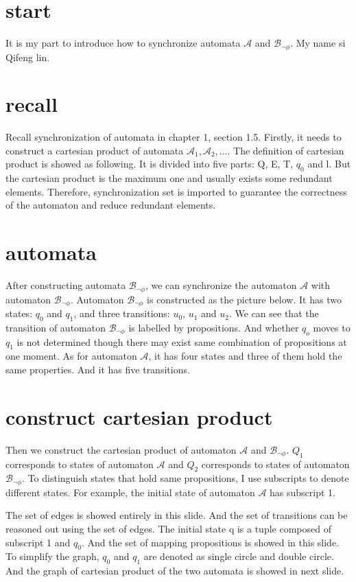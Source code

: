 \documentclass{article}
\begin{document}
    \section{start}
        It is my part to introduce how to synchronize automata $\mathcal{A}$ and $\mathcal{B}_{\neg\phi}$. My name si Qifeng lin.
        
    \section{recall}
        Recall synchronization of automata in chapter 1, section 1.5. Firstly, it needs to construct a cartesian product of automata $\mathcal{A}_1,\mathcal{A}_2,\dots$. The definition of cartesian product is showed as following. It is divided into five parts: Q, E, T, $q_0$ and l. But the cartesian product is the maximum one and usually exists some redundant elements. Therefore, synchronization set is imported to guarantee the correctness of the automaton and reduce redundant elements.

    \section{automata}
        After constructing automata $\mathcal{B}_{\neg\phi}$, we can synchronize the automaton $\mathcal{A}$ with automaton $\mathcal{B}_{\neg\phi}$. Automaton $\mathcal{B}_{\neg\phi}$ is constructed as the picture below. It has two states: $q_0$ and $q_1$, and three transitions: $u_0$, $u_1$ and $u_2$. We can see that the transition of automaton $\mathcal{B}_{\neg\phi}$ is labelled by propositions. And whether $q_o$ moves to $q_1$ is not determined though there may exist same combination of propositions at one moment. As for automaton $\mathcal{A}$, it has four states and three of them hold the same properties. And it has five transitions.

    \section{construct cartesian product}
        Then we construct the cartesian product of automaton $\mathcal{A}$ and $\mathcal{B}_{\neg\phi}$. $Q_1$ corresponds to states of automaton $\mathcal{A}$ and $Q_2$ corresponds to states of automaton $\mathcal{B}_{\neg\phi}$. To distinguish states that hold same propositions, I use subscripts to denote different states. For example, the initial state of automaton $\mathcal{A}$ has subscript 1.

        The set of edges is showed entirely in this slide. And the set of transitions can be reasoned out using the set of edges. The initial state q is a tuple composed of subscript 1 and $q_0$. And the set of mapping propositions is showed in this slide. To simplify the graph, $q_0$ and $q_1$ are denoted as single circle and double circle. And the graph of cartesian product of the two automata is showed in next slide.
\end{document}
